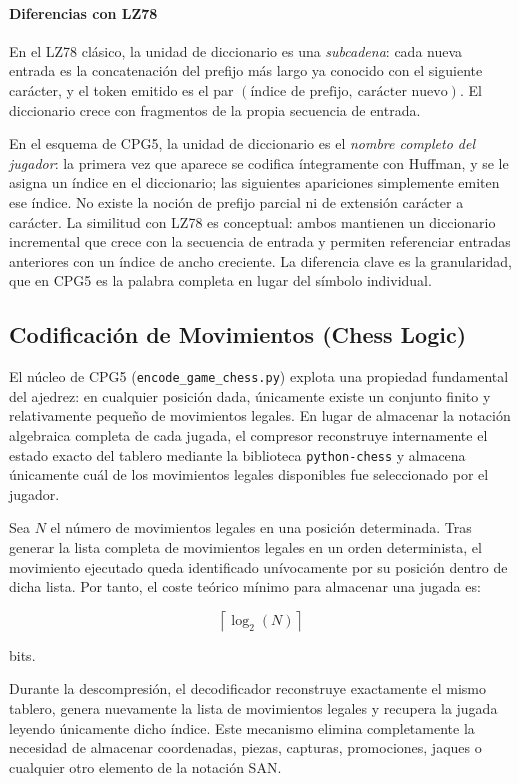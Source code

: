 \documentclass[11pt, letterpaper]{article}
\begin{document}
\paragraph{Diferencias con LZ78}
En el LZ78 clásico, la unidad de diccionario es una \textit{subcadena}: cada nueva entrada es la concatenación del prefijo más largo ya conocido con el siguiente carácter, y el token emitido es el par $(\text{índice de prefijo},\ \text{carácter nuevo})$. El diccionario crece con fragmentos de la propia secuencia de entrada.

En el esquema de CPG5, la unidad de diccionario es el \textit{nombre completo del jugador}: la primera vez que aparece se codifica íntegramente con Huffman, y se le asigna un índice en el diccionario; las siguientes apariciones simplemente emiten ese índice. No existe la noción de prefijo parcial ni de extensión carácter a carácter. La similitud con LZ78 es conceptual: ambos mantienen un diccionario incremental que crece con la secuencia de entrada y permiten referenciar entradas anteriores con un índice de ancho creciente. La diferencia clave es la granularidad, que en CPG5 es la palabra completa en lugar del símbolo individual.

\subsection{Codificación de Movimientos (Chess Logic)}

El núcleo de CPG5 (\texttt{encode\_game\_chess.py}) explota una propiedad fundamental del ajedrez: en cualquier posición dada, únicamente existe un conjunto finito y relativamente pequeño de movimientos legales. En lugar de almacenar la notación algebraica completa de cada jugada, el compresor reconstruye internamente el estado exacto del tablero mediante la biblioteca \texttt{python-chess} y almacena únicamente cuál de los movimientos legales disponibles fue seleccionado por el jugador.

Sea $N$ el número de movimientos legales en una posición determinada. Tras generar la lista completa de movimientos legales en un orden determinista, el movimiento ejecutado queda identificado unívocamente por su posición dentro de dicha lista. Por tanto, el coste teórico mínimo para almacenar una jugada es:

\[
\left\lceil \log_2(N) \right\rceil
\]

bits.

Durante la descompresión, el decodificador reconstruye exactamente el mismo tablero, genera nuevamente la lista de movimientos legales y recupera la jugada leyendo únicamente dicho índice. Este mecanismo elimina completamente la necesidad de almacenar coordenadas, piezas, capturas, promociones, jaques o cualquier otro elemento de la notación SAN.
\end{document}

